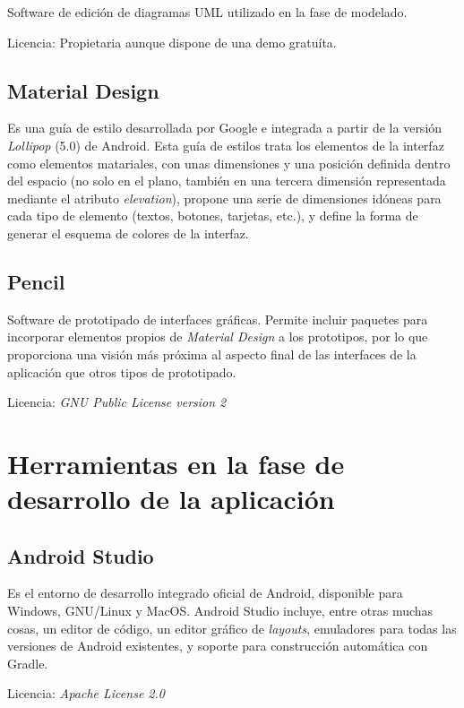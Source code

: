 Software de edición de diagramas UML utilizado en la fase de modelado. 

Licencia: Propietaria aunque dispone de una demo gratuíta. 

\subsection{Material Design}

Es una guía de estilo desarrollada por Google e integrada a partir de la versión \textit{Lollipop} (5.0) de Android. Esta guía de estilos trata los elementos de la interfaz como elementos matariales, con unas dimensiones y una posición definida dentro del espacio (no solo en el plano, también en una tercera dimensión representada mediante el atributo \textit{elevation}), propone una serie de dimensiones idóneas para cada tipo de elemento (textos, botones, tarjetas, etc.), y define la forma de generar el esquema de colores de la interfaz.

\subsection{Pencil}

Software de prototipado de interfaces gráficas. Permite incluir paquetes para incorporar elementos propios de \textit{Material Design} a los prototipos, por lo que proporciona una visión más próxima al aspecto final de las interfaces de la aplicación que otros tipos de prototipado. 

Licencia: \textit{GNU Public License version 2} 

\section{Herramientas en la fase de desarrollo de la aplicación}

\subsection{Android Studio}

Es el entorno de desarrollo integrado oficial de Android, disponible para Windows, GNU/Linux y MacOS. Android Studio incluye, entre otras muchas cosas, un editor de código, un editor gráfico de \textit{layouts}, emuladores para todas las versiones de Android existentes, y soporte para construcción automática con Gradle. 

Licencia: \textit{Apache License 2.0}

